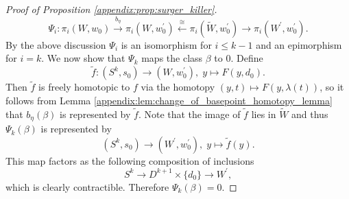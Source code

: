 \begin{proof}[Proof of Proposition \ref{appendix:prop:surger_killer}]
    \[
    \Psi_i \colon \pi_i(W,w_0) \xrightarrow{b_\eta} \pi_i(W,w_0^\prime) \xleftarrow{\cong} \pi_i(\tilde{W},w_0^\prime) \to \pi_i(W^\prime,w_0^\prime).
    \]
    By the above discussion $\Psi_i$ is an isomorphism for $i \leq k-1$ and an epimorphism for $i = k$. We now show that $\Psi_k$ maps the class $\beta$ to $0$. Define
    \[
    \tilde{f} \colon (S^k,s_0) \to (W,w_0^\prime), \; y \mapsto F(y,d_0).
    \]
    Then $\tilde{f}$ is freely homotopic to $f$ via the homotopy $(y,t) \mapsto F(y,\lambda(t))$, so it follows from Lemma \ref{appendix:lem:change_of_basepoint_homotopy_lemma} that $b_\eta(\beta)$ is represented by $\tilde{f}$. Note that the image of $\tilde{f}$ lies in $\tilde{W}$ and thus $\Psi_k(\beta)$ is represented by
    \[
    (S^k,s_0) \to (W^\prime,w_0^\prime), \; y \mapsto \tilde{f}(y).
    \]
    This map factors as the following composition of inclusions
    \[
    S^k \to D^{k+1} \times \{d_0\} \to W^\prime,
    \]
    which is clearly contractible. Therefore $\Psi_k(\beta) = 0$. 
    \vspace{.5em}


\end{proof}
